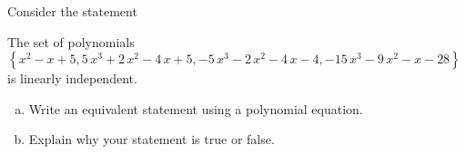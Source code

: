 
\begin{exerciseStatement}


Consider the statement 
\begin{center}\begin{minipage}{0.8\textwidth}
 The set of polynomials \( \left\{ x^{2} - x + 5 , 5 \, x^{3} + 2 \, x^{2} - 4 \, x + 5 , -5 \, x^{3} - 2 \, x^{2} - 4 \, x - 4 , -15 \, x^{3} - 9 \, x^{2} - x - 28 \right\} \) is linearly independent.
\end{minipage}\end{center}
    


\begin{enumerate}[(a)]
\item  Write an equivalent statement using a polynomial equation.
\item  Explain why your statement is true or false.
\end{enumerate}
    
\end{exerciseStatement}
    
